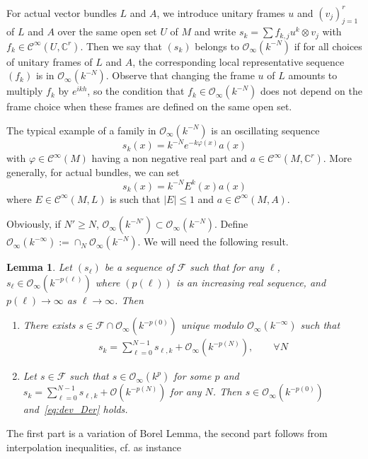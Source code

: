 \documentclass[10pt,a4paper]{article}
\newtheorem{lemm}[theo]{Lemma}
\theoremstyle{definition}
\numberwithin{equation}{section}
\newcommand{\C}{{\mathbb{C}}}
\newcommand{\Ci}{{\mathcal{C}}^{\infty}}
\newcommand{\bigo}{\mathcal{O}}
\newcommand{\biginf}{\mathcal{O}_{\infty}}
\newcommand{\Fam}{\mathcal{F}}
\let\oldforall\forall
\renewcommand*{\forall}{\mathrel{\oldforall}}
\begin{document}
For actual vector bundles $L$ and $A$, we introduce unitary frames $u$ and $(v_j)_{j=1}^{r}$ of $L$ and $A$ over the same open set $U$ of $M$ and write $s_k = \sum f_{k,j} u^k
\otimes v_j$ with $f_{k} \in \Ci (U, \C^r)$. Then we say that $(s_k)$ belongs to $\biginf (k^{-N})$ if for all choices of unitary frames of $L$ and $A$, the corresponding local representative sequence $(f_k)$ is in $\biginf(k^{-N})$. Observe that changing the frame $u$ of $L$ amounts to multiply $f_k$ by $e^{ikh}$, so the condition that $f_k \in \biginf (k^{-N})$ does not depend on the frame choice when these frames are defined on the same open set.

The typical example of a family in $\biginf (k^{-N})$ is an oscillating sequence
\[
s_k (x) = k^{-N}
e^{-k \varphi (x) } a (x)
\]
with $ \varphi \in \Ci (M)$ having a non negative real part and $a \in \Ci (M, \C^r)$. More generally, for actual bundles, we can set
\[
s_k (x)
= k^{-N} E^k(x) a(x)
\]
where $E \in \Ci (M, L)$ is such that $|E|\leqslant 1$ and $a
\in \Ci (M, A)$.


Obviously, if $N' \geqslant N$, $\biginf (k^{-N'}) \subset \biginf (k^{-N})$. Define $\biginf (k^{-\infty}) := \cap_N \biginf (k^{-N})$. We will need the following result.


\begin{lemm}\label{lem:dev_der_bor}
Let $(s_\ell)$ be a sequence of $\Fam$ such that for any $\ell$, $s_{\ell} \in
\biginf (k^{-p(\ell)}) $ where $(p(\ell))$ is an increasing real sequence, and $p(\ell)
\rightarrow \infty$ as $\ell \rightarrow \infty$. Then
\begin{enumerate}
\item There exists $s \in \Fam \cap \biginf (k^{-p(0)})$ unique modulo $\biginf (k^{-\infty})$ such that
\begin{gather}\label{eq:dev_Der}
s_k = \sum_{\ell =0}^{N-1} s_{\ell,k} + \biginf \left(k^{-p(N)}\right), \qquad
\forall N
\end{gather}
\item Let $s \in \Fam$ such that $s \in \biginf (k^{p})$ for some $p$ and $s_k =
\sum_{\ell =0}^{N-1} s_{\ell,k} + \bigo (k^{-p(N)})$ for any $N$. Then $s
\in \biginf (k^{-p(0)})$ and~\eqref{eq:dev_Der} holds.
\end{enumerate}
\end{lemm}

The first part is a variation of Borel Lemma, the second part follows from interpolation inequalities, cf. as instance~\cite[Lemma~32.]{Shubin}
\end{document}
